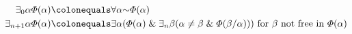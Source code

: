\vspace{-.2in}
\begin{align*}
  \qt{\exists_0}{\alpha}\metaA(\alpha) &\colonequals \qt{\forall}{\alpha}\enot\metaA(\alpha)\\
  \qt{\exists_{n+1}}{\alpha}\metaA(\alpha) &\colonequals \qt{\exists}{\alpha}(\metaA(\alpha) \eand \qt{\exists_n}{\beta}(\alpha \neq \beta \eand \metaA(\beta/\alpha))) \text{ for } \beta \text{ not free in } \metaA(\alpha)
\end{align*}

